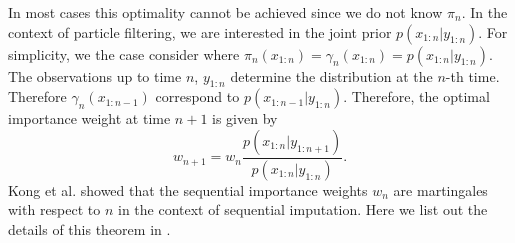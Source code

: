\documentclass[10pt]{article}
\theoremstyle{definition}
\numberwithin{equation}{section}
\begin{document}
In most cases this optimality cannot be achieved since we do not know $\pi_n$. In the context of particle filtering, we are interested in the joint prior $p(x_{1:n}|y_{1:n})$. For simplicity, we the case consider where $\pi_n(x_{1:n}) = \gamma_n(x_{1:n}) = p(x_{1:n}|y_{1:n})$. The observations up to time $n$, $y_{1:n}$ determine the distribution at the $n$-th time. Therefore $\gamma_n(x_{1:n-1})$ correspond to $p(x_{1:n-1}|y_{1:n})$. Therefore, the optimal importance weight at time $n+1$ is given by
\begin{equation}
	w_{n+1} = w_n \dfrac{p(x_{1:n}|y_{1:n+1})}{p(x_{1:n}|y_{1:n})}.
\end{equation}
Kong et al. \cite{kong1994} showed that the sequential importance weights $w_n$ are martingales with respect to $n$ in the context of sequential imputation. Here we list out the details of this theorem in \cite{kong1994}.
\end{document}
